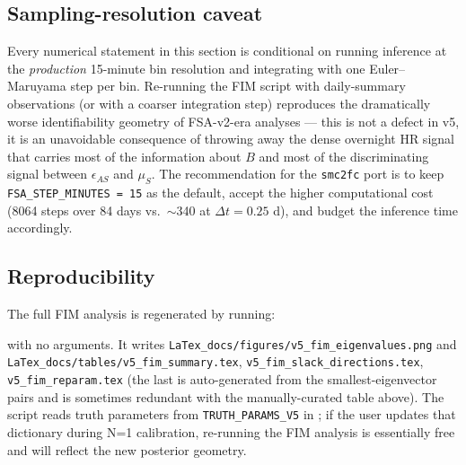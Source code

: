 \subsection{Sampling-resolution caveat}

Every numerical statement in this section is conditional on running inference at the \emph{production} 15-minute bin resolution and integrating with one Euler--Maruyama step per bin. Re-running the FIM script with daily-summary observations (or with a coarser integration step) reproduces the dramatically worse identifiability geometry of FSA-v2-era analyses --- this is not a defect in v5, it is an unavoidable consequence of throwing away the dense overnight HR signal that carries most of the information about $B$ and most of the discriminating signal between $\epsilon_{AS}$ and $\mu_S$. The recommendation for the \texttt{smc2fc} port is to keep \texttt{FSA\_STEP\_MINUTES = 15} as the default, accept the higher computational cost (8064 steps over 84 days vs.\ $\sim$340 at $\Delta t = 0.25$ d), and budget the inference time accordingly.

\subsection{Reproducibility}

The full FIM analysis is regenerated by running:
\begin{center}\end{center}
with no arguments. It writes \texttt{LaTex\_docs/figures/v5\_fim\_eigenvalues.png} and \texttt{LaTex\_docs/tables/v5\_fim\_summary.tex}, \texttt{v5\_fim\_slack\_directions.tex}, \texttt{v5\_fim\_reparam.tex} (the last is auto-generated from the smallest-eigenvector pairs and is sometimes redundant with the manually-curated table above). The script reads truth parameters from \texttt{TRUTH\_PARAMS\_V5} in ; if the user updates that dictionary during N=1 calibration, re-running the FIM analysis is essentially free and will reflect the new posterior geometry.
